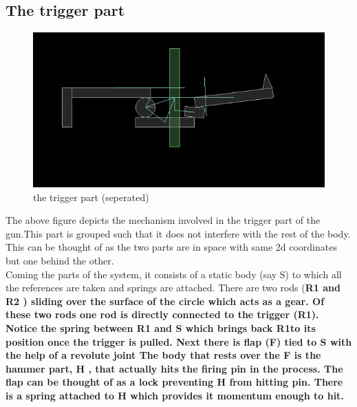 \documentclass[11pt]{article}
\begin{document}
\subsection{The trigger part}
\begin{figure}[here]
\begin{center}\includegraphics[scale=0.3]{../details/images/trigger.png}
\caption{the trigger part (seperated)}
\end{center}
\end{figure}


The above figure depicts the mechanism involved in the trigger part of the gun.This part is grouped \cite{box2d}
such that it does not interfere with the rest of the body. This can be thought of as the two parts are in space with same 2d coordinates but one behind the other.\\
   Coming the parts of the system, it consists of a static body (say S) to which all the references are taken and springs are attached. There are two rods (\bf R1 \rm and \bf R2 \rm ) sliding over the surface of the circle which acts as a gear. Of these two rods one rod is directly connected to the trigger (\bf R1\rm). Notice the spring between \bf R1 \rm and \bf S \rm  which brings back \bf R1\rm to its position once the trigger is pulled. Next there is flap (\bf F\rm) tied to \bf S \rm with the help of a revolute joint\cite{box2d}
The body that rests over the \bf F \rm is the hammer part, \bf H \rm, that actually hits the firing pin in the process. The flap can be thought of as a lock preventing \bf H \rm from hitting pin. There is a spring attached to \bf H \rm which provides it momentum enough to hit.
\end{document}
